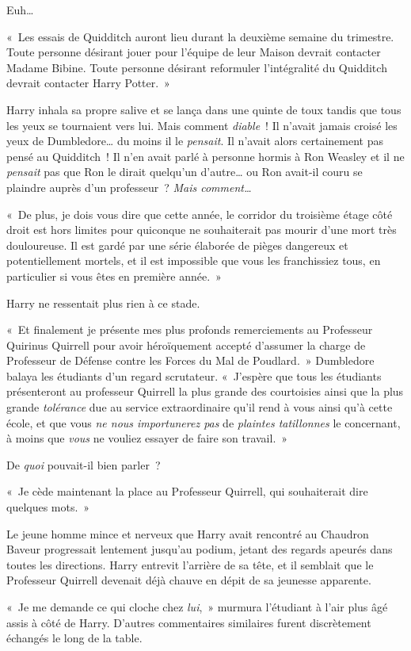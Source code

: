 Euh…

«~Les essais de Quidditch auront lieu durant la deuxième semaine du trimestre. Toute personne désirant jouer pour l'équipe de leur Maison devrait contacter Madame Bibine. Toute personne désirant reformuler l'intégralité du Quidditch devrait contacter Harry Potter.~»

Harry inhala sa propre salive et se lança dans une quinte de toux tandis que tous les yeux se tournaient vers lui. Mais comment \emph{diable}~! Il n'avait jamais croisé les yeux de Dumbledore… du moins il le \emph{pensait}. Il n'avait alors certainement pas pensé au Quidditch~! Il n'en avait parlé à personne hormis à Ron Weasley et il ne \emph{pensait} pas que Ron le dirait quelqu'un d'autre… ou Ron avait-il couru se plaindre auprès d'un professeur~? \emph{Mais comment…}

«~De plus, je dois vous dire que cette année, le corridor du troisième étage côté droit est hors limites pour quiconque ne souhaiterait pas mourir d'une mort très douloureuse. Il est gardé par une série élaborée de pièges dangereux et potentiellement mortels, et il est impossible que vous les franchissiez tous, en particulier si vous êtes en première année.~»

Harry ne ressentait plus rien à ce stade.

«~Et finalement je présente mes plus profonds remerciements au Professeur Quirinus Quirrell pour avoir héroïquement accepté d'assumer la charge de Professeur de Défense contre les Forces du Mal de Poudlard.~» Dumbledore balaya les étudiants d'un regard scrutateur. «~J'espère que tous les étudiants présenteront au professeur Quirrell la plus grande des courtoisies ainsi que la plus grande \emph{tolérance} due au service extraordinaire qu'il rend à vous ainsi qu'à cette école, et que vous \emph{ne nous importunerez pas} de \emph{plaintes tatillonnes} le concernant, à moins que \emph{vous} ne vouliez essayer de faire son travail.~»

De \emph{quoi} pouvait-il bien parler~?

«~Je cède maintenant la place au Professeur Quirrell, qui souhaiterait dire quelques mots.~»

Le jeune homme mince et nerveux que Harry avait rencontré au Chaudron Baveur progressait lentement jusqu'au podium, jetant des regards apeurés dans toutes les directions. Harry entrevit l'arrière de sa tête, et il semblait que le Professeur Quirrell devenait déjà chauve en dépit de sa jeunesse apparente.

«~Je me demande ce qui cloche chez \emph{lui},~» murmura l'étudiant à l'air plus âgé assis à côté de Harry. D'autres commentaires similaires furent discrètement échangés le long de la table.

